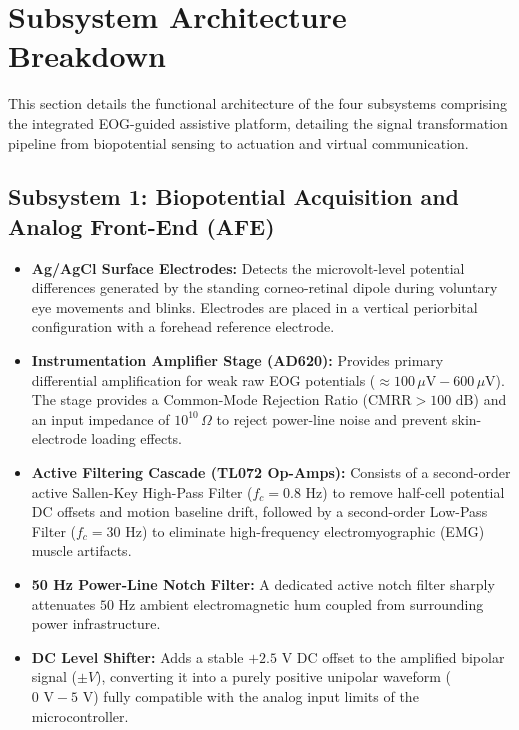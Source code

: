 \section{Subsystem Architecture Breakdown}
\label{sec:subsystem_architecture_breakdown}
\label{sec:system_operations_description}

This section details the functional architecture of the four subsystems comprising the integrated EOG-guided assistive platform, detailing the signal transformation pipeline from biopotential sensing to actuation and virtual communication.

\subsection{Subsystem 1: Biopotential Acquisition and Analog Front-End (AFE)}
\label{subsec:subsystem1_afe}
\label{subsec:physiological_signal_generation}
\label{subsec:differential_amplification}
\label{subsec:analog_bandpass_filtering}
\label{subsec:dc_level_shifting}

\begin{itemize}
    \item \textbf{Ag/AgCl Surface Electrodes:} Detects the microvolt-level potential differences generated by the standing corneo-retinal dipole during voluntary eye movements and blinks. Electrodes are placed in a vertical periorbital configuration with a forehead reference electrode.
    \item \textbf{Instrumentation Amplifier Stage (AD620):} Provides primary differential amplification for weak raw EOG potentials ($\approx 100\,\mu\text{V} - 600\,\mu\text{V}$). The stage provides a Common-Mode Rejection Ratio ($\text{CMRR} > 100\text{ dB}$) and an input impedance of $10^{10}\,\Omega$ to reject power-line noise and prevent skin-electrode loading effects.
    \item \textbf{Active Filtering Cascade (TL072 Op-Amps):} Consists of a second-order active Sallen-Key High-Pass Filter ($f_c = 0.8\text{ Hz}$) to remove half-cell potential DC offsets and motion baseline drift, followed by a second-order Low-Pass Filter ($f_c = 30\text{ Hz}$) to eliminate high-frequency electromyographic (EMG) muscle artifacts.
    \item \textbf{50 Hz Power-Line Notch Filter:} A dedicated active notch filter sharply attenuates $50\text{ Hz}$ ambient electromagnetic hum coupled from surrounding power infrastructure.
    \item \textbf{DC Level Shifter:} Adds a stable $+2.5\text{ V}$ DC offset to the amplified bipolar signal ($\pm V$), converting it into a purely positive unipolar waveform ($0\text{ V} - 5\text{ V}$) fully compatible with the analog input limits of the microcontroller.
\end{itemize}

